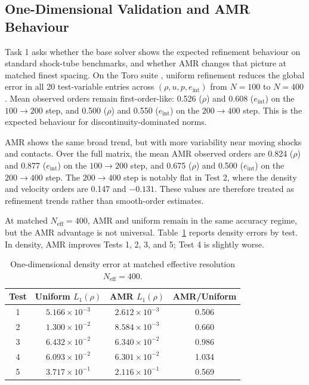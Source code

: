 \documentclass[final,3p,times,twocolumn]{elsarticle}
\newif\ifwithpaths
\DeclareRobustCommand{\pathnote}[1]{\ifwithpaths\textit{ [source: \nolinkurl{#1}]}\fi}
\begin{document}
\subsection{One-Dimensional Validation and AMR Behaviour}

Task 1 asks whether the base solver shows the expected refinement behaviour on standard shock-tube benchmarks, and whether AMR changes that picture at matched finest spacing. On the Toro suite \cite{toro2009}, uniform refinement reduces the global error in all 20 test-variable entries across $(\rho,u,p,e_{\mathrm{int}})$ from $N=100$ to $N=400$. Mean observed orders remain first-order-like: 0.526 ($\rho$) and 0.608 ($e_{\mathrm{int}}$) on the $100\to200$ step, and 0.500 ($\rho$) and 0.550 ($e_{\mathrm{int}}$) on the $200\to400$ step. This is the expected behaviour for discontinuity-dominated norms.

AMR shows the same broad trend, but with more variability near moving shocks and contacts. Over the full matrix, the mean AMR observed orders are 0.824 ($\rho$) and 0.877 ($e_{\mathrm{int}}$) on the $100\to200$ step, and 0.675 ($\rho$) and 0.500 ($e_{\mathrm{int}}$) on the $200\to400$ step. The $200\to400$ step is notably flat in Test 2, where the density and velocity orders are 0.147 and $-0.131$. These values are therefore treated as refinement trends rather than smooth-order estimates.

At matched $N_\mathrm{eff}=400$, AMR and uniform remain in the same accuracy regime, but the AMR advantage is not universal. Table~\ref{tab:rho_1d_compare} reports density errors by test. In density, AMR improves Tests 1, 2, 3, and 5; Test 4 is slightly worse.

\begin{table}[!htbp]
\centering
\small
\begin{tabular}{@{}c c c c@{}}
\hline
Test & Uniform $L_1(\rho)$ & AMR $L_1(\rho)$ & AMR/Uniform \\
\hline
1 & $5.166\times10^{-3}$ & $2.612\times10^{-3}$ & 0.506 \\
2 & $1.300\times10^{-2}$ & $8.584\times10^{-3}$ & 0.660 \\
3 & $6.432\times10^{-2}$ & $6.340\times10^{-2}$ & 0.986 \\
4 & $6.093\times10^{-2}$ & $6.301\times10^{-2}$ & 1.034 \\
5 & $3.717\times10^{-1}$ & $2.116\times10^{-1}$ & 0.569 \\
\hline
\end{tabular}
\caption{One-dimensional density error at matched effective resolution $N_\mathrm{eff}=400$.\pathnote{Task1/outputs/toro1d_errors.csv}}
\label{tab:rho_1d_compare}
\end{table}
\end{document}
